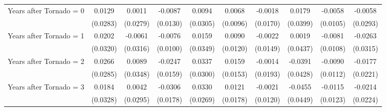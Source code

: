 \documentclass[letterpaper]{article}
\begin{document}
\begin{table}[H]
{\begin{tabular}{lccccccccc}
   Years after Tornado = 0       & 0.0129                         & 0.0011                        & -0.0087                         & 0.0094                          & 0.0068                    & -0.0018                       & 0.0179                   & -0.0058                 & -0.0058\\   
                                             & (0.0283)                       & (0.0279)                      & (0.0130)                        & (0.0305)                        & (0.0096)                  & (0.0170)                      & (0.0399)                 & (0.0105)                & (0.0293)\\   
   Years after Tornado = 1      & 0.0202                         & -0.0061                       & -0.0076                         & 0.0159                          & 0.0090                    & -0.0022                       & 0.0019                   & -0.0081                 & -0.0263\\   
                                             & (0.0320)                       & (0.0316)                      & (0.0100)                        & (0.0349)                        & (0.0120)                  & (0.0149)                      & (0.0437)                 & (0.0108)                & (0.0315)\\   
   Years after Tornado = 2      & 0.0266                         & 0.0089                        & -0.0247                         & 0.0337                          & 0.0159                    & -0.0014                       & -0.0391                  & -0.0090                 & -0.0177\\   
                                             & (0.0285)                       & (0.0348)                      & (0.0159)                        & (0.0300)                        & (0.0153)                  & (0.0193)                      & (0.0428)                 & (0.0112)                & (0.0221)\\   
   Years after Tornado = 3      & 0.0184                         & 0.0042                        & -0.0306                         & 0.0330                          & 0.0121                    & -0.0021                       & -0.0455                  & -0.0115                 & -0.0214\\   
                                             & (0.0328)                       & (0.0295)                      & (0.0178)                        & (0.0269)                        & (0.0178)                  & (0.0120)                      & (0.0449)                 & (0.0123)                & (0.0224)\\   

\end{tabular}}
\end{table}
\end{document}

